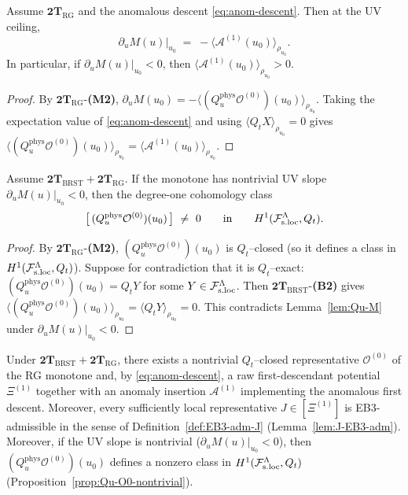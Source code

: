 \begin{lemma}
\label{lem:Qu-M}
Assume $\mathbf{2T}_{\mathrm{RG}}$ and the anomalous descent
\eqref{eq:anom-descent}. Then at the UV ceiling,
\[
\partial_u M(u)\big\rvert_{u_0}
\;=\;
-\big\langle \mathcal A^{(1)}(u_0)\big\rangle_{\rho_{u_0}}.
\]
In particular, if $\partial_u M(u)\rvert_{u_0}<0$, then
$\big\langle \mathcal A^{(1)}(u_0)\big\rangle_{\rho_{u_0}}>0$.
\end{lemma}

\begin{proof}
By $\mathbf{2T}_{\mathrm{RG}}$-\textbf{(M2)},
$\partial_u M(u_0)=-\langle (Q_u^{\mathrm{phys}}\mathcal O^{(0)})(u_0)\rangle_{\rho_{u_0}}$.
Taking the expectation value of \eqref{eq:anom-descent} and using
$\langle Q_t X\rangle_{\rho_{u_0}}=0$ gives
$\langle (Q_u^{\mathrm{phys}}\mathcal O^{(0)})(u_0)\rangle_{\rho_{u_0}}
=\langle \mathcal A^{(1)}(u_0)\rangle_{\rho_{u_0}}$.
\end{proof}

\begin{proposition}
\label{prop:Qu-O0-nontrivial}
Assume $\mathbf{2T}_{\mathrm{BRST}}+\mathbf{2T}_{\mathrm{RG}}$. If the monotone
has nontrivial UV slope $\partial_u M(u)\rvert_{u_0}<0$, then the degree-one
cohomology class
\[
\big[\, (Q_u^{\mathrm{phys}}\mathcal O^{(0)})(u_0)\,\big]\ \neq\ 0
\qquad\text{in}\qquad H^1(\mathcal F_{\mathrm{s.loc}}^\Lambda,Q_t).
\]
\end{proposition}

\begin{proof}
By $\mathbf{2T}_{\mathrm{RG}}$-\textbf{(M2)}, $(Q_u^{\mathrm{phys}}\mathcal O^{(0)})(u_0)$
is $Q_t$--closed (so it defines a class in $H^1(\mathcal F_{\mathrm{s.loc}}^\Lambda,Q_t)$).
Suppose for contradiction that it is $Q_t$--exact:
$(Q_u^{\mathrm{phys}}\mathcal O^{(0)})(u_0)=Q_tY$ for some $Y\in\mathcal F_{\mathrm{s.loc}}^\Lambda$.
Then $\mathbf{2T}_{\mathrm{BRST}}$-\textbf{(B2)} gives
$\langle (Q_u^{\mathrm{phys}}\mathcal O^{(0)})(u_0)\rangle_{\rho_{u_0}}
=\langle Q_tY\rangle_{\rho_{u_0}}=0$.
This contradicts Lemma~\ref{lem:Qu-M} under $\partial_u M(u)\rvert_{u_0}<0$.
\end{proof}

\begin{theorem}
\label{thm:good-O0-from-RG}
Under $\mathbf{2T}_{\mathrm{BRST}}+\mathbf{2T}_{\mathrm{RG}}$, there exists a
nontrivial $Q_t$--closed representative $\mathcal O^{(0)}$ of the RG monotone and,
by \eqref{eq:anom-descent}, a raw first-descendant potential \(\Xi^{(1)}\) together
with an anomaly insertion $\mathcal A^{(1)}$ implementing the anomalous first
descent.
Moreover, every sufficiently local representative \(J\in[\Xi^{(1)}]\) is
EB3-admissible in the sense of Definition~\ref{def:EB3-adm-J}
(Lemma~\ref{lem:J-EB3-adm}).
Moreover, if the UV slope is nontrivial ($\partial_u M(u)\rvert_{u_0}<0$), then
$(Q_u^{\mathrm{phys}}\mathcal O^{(0)})(u_0)$ defines a nonzero class in
$H^1(\mathcal F_{\mathrm{s.loc}}^\Lambda,Q_t)$ (Proposition~\ref{prop:Qu-O0-nontrivial}).
\end{theorem}

